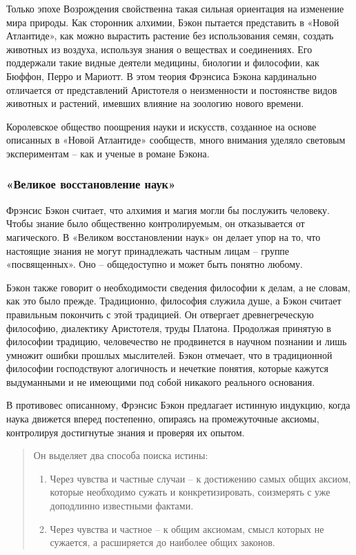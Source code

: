 \documentclass[
]{article}
\begin{document}
Только эпохе Возрождения свойственна такая сильная ориентация на
изменение мира природы. Как сторонник алхимии, Бэкон пытается
представить в «Новой Атлантиде», как можно вырастить растение без
использования семян, создать животных из воздуха, используя знания о
веществах и соединениях. Его поддержали такие видные деятели медицины,
биологии и философии, как Бюффон, Перро и Мариотт. В этом теория
Фрэнсиса Бэкона кардинально отличается от представлений Аристотеля о
неизменности и постоянстве видов животных и растений, имевших влияние на
зоологию нового времени.

Королевское общество поощрения науки и искусств, созданное на основе
описанных в «Новой Атлантиде» сообществ, много внимания уделяло световым
экспериментам -- как и ученые в романе Бэкона.

\hypertarget{ux432ux435ux43bux438ux43aux43eux435-ux432ux43eux441ux441ux442ux430ux43dux43eux432ux43bux435ux43dux438ux435-ux43dux430ux443ux43a}{%
\subsubsection{«Великое восстановление
наук»}\label{ux432ux435ux43bux438ux43aux43eux435-ux432ux43eux441ux441ux442ux430ux43dux43eux432ux43bux435ux43dux438ux435-ux43dux430ux443ux43a}}

Фрэнсис Бэкон считает, что алхимия и магия могли бы послужить человеку.
Чтобы знание было общественно контролируемым, он отказывается от
магического. В «Великом восстановлении наук» он делает упор на то, что
настоящие знания не могут принадлежать частным лицам -- группе
«посвященных». Оно -- общедоступно и может быть понятно любому.

Бэкон также говорит о необходимости сведения философии к делам, а не
словам, как это было прежде. Традиционно, философия служила душе, а
Бэкон считает правильным покончить с этой традицией. Он отвергает
древнегреческую философию, диалектику Аристотеля, труды Платона.
Продолжая принятую в философии традицию, человечество не продвинется в
научном познании и лишь умножит ошибки прошлых мыслителей. Бэкон
отмечает, что в традиционной философии господствуют алогичность и
нечеткие понятия, которые кажутся выдуманными и не имеющими под собой
никакого реального основания.

В противовес описанному, Фрэнсис Бэкон предлагает истинную индукцию,
когда наука движется вперед постепенно, опираясь на промежуточные
аксиомы, контролируя достигнутые знания и проверяя их опытом.

\begin{quote}
Он выделяет два способа поиска истины:

\begin{enumerate}
\def\labelenumi{\arabic{enumi}.}
\item
  Через чувства и частные случаи -- к достижению самых общих аксиом,
  которые необходимо сужать и конкретизировать, соизмерять с уже
  доподлинно известными фактами.
\item
  Через чувства и частное -- к общим аксиомам, смысл которых не
  сужается, а расширяется до наиболее общих законов.
\end{enumerate}
\end{quote}
\end{document}
